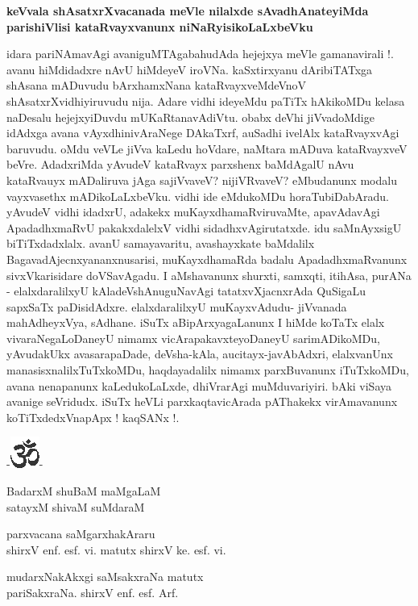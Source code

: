\noindent
{\bf\large{keVvala shAsatxrXvacanada meVle nilalxde sAvadhAnateyiMda parishiVlisi kataRvayxvanunx niNaRyisikoLaLxbeVku}}\label{page253}

idara pariNAmavAgi avaniguMTAgabahudAda hejejxya meVle gamanavirali !. avanu hiMdidadxre nAvU hiMdeyeV iroVNa. kaSxtirxyanu dAribiTATxga shAsana mADuvudu bArxhamxNana kataRvayxveMdeVnoV shAsatxrXvidhiyiruvudu nija. Adare vidhi ideyeMdu paTiTx hAkikoMDu kelasa naDesalu hejejxyiDuvdu mUKaRtanavAdiVtu. obabx deVhi jiVvadoMdige idAdxga avana vAyxdhinivAraNege DAkaTxrf, auSadhi ivelAlx kataRvayxvAgi baruvudu. oMdu veVLe jiVva kaLedu hoVdare, naMtara mADuva kataRvayxveV beVre. AdadxriMda yAvudeV kataRvayx parxshenx baMdAgalU nAvu kataRvauyx mADaliruva jAga sajiVvaveV? nijiVRvaveV? eMbudanunx modalu vayxvasethx mADikoLaLxbeVku. vidhi ide eMdukoMDu horaTubiDabAradu. yAvudeV vidhi idadxrU, adakekx muKayxdhamaRviruvaMte, apavAdavAgi ApadadhxmaRvU pakakxdalelxV vidhi sidadhxvAgirutatxde. idu saMnAyxsigU biTiTxdadxlalx. avanU samayavaritu, avashayxkate baMdalilx BagavadAjecnxyananxnusarisi, muKayxdhamaRda badalu ApadadhxmaRvanunx sivxVkarisidare doVSavAgadu. I aMshavanunx shurxti, samxqti, itihAsa, purANa - elalxdaralilxyU kAladeVshAnuguNavAgi tatatxvXjacnxrAda QuSigaLu sapxSaTx paDisidAdxre. elalxdaralilxyU muKayxvAdudu- jiVvanada mahAdheyxVya, sAdhane. iSuTx aBipArxyagaLanunx I hiMde koTaTx elalx vivaraNegaLoDaneyU nimamx vicArapakavxteyoDaneyU sarimADikoMDu, yAvudakUkx avasarapaDade, deVsha-kAla, aucitayx-javAbAdxri, elalxvanUnx manasisxnalilxTuTxkoMDu, haqdayadalilx nimamx parxBuvanunx iTuTxkoMDu, avana nenapanunx kaLedukoLaLxde, dhiVrarAgi muMduvariyiri. bAki viSaya avanige seVridudx. iSuTx heVLi parxkaqtavicArada pAThakekx virAmavanunx koTiTxdedxVnapApx ! kaqSANx !.

\begin{center}
-\includegraphics{om.eps}-
\end{center}

\begin{center}
BadarxM shuBaM maMgaLaM\\
satayxM shivaM suMdaraM
\end{center}

\begin{flushright}
parxvacana saMgarxhakAraru\\
shirxV enf. esf. vi. matutx shirxV ke. esf. vi.
\end{flushright}

\begin{flushleft}
mudarxNakAkxgi saMsakxraNa matutx\\
pariSakxraNa. shirxV enf. esf. Arf.
\end{flushleft}



